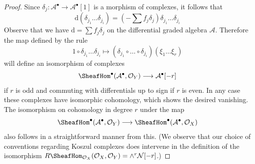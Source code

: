 \begin{proof}
Since $\delta_j : \mathcal{A}^\bullet \to \mathcal{A}^\bullet[1]$
is a morphism of complexes, it follows that
$$
\text{d}(\delta_{j_1} \ldots \delta_{j_i}) =
(- \sum f_j \delta_j )\delta_{j_1} \ldots \delta_{j_i}
$$
Observe that we have $\text{d} = \sum f_j \delta_j$ on the differential
graded algebra $\mathcal{A}$. Therefore the map defined by the rule
$$
1 \circ \delta_{j_1} \ldots \delta_{j_i} \longmapsto
(\delta_{j_1} \circ \ldots \circ \delta_{j_i})(\xi_1 \ldots \xi_r)
$$
will define an isomorphism of complexes
$$
\SheafHom^\bullet(\mathcal{A}^\bullet, \mathcal{O}_Y)
\longrightarrow \mathcal{A}^\bullet[-r]
$$
if $r$ is odd and commuting with differentials up to sign if $r$ is even.
In any case these complexes have isomorphic cohomology, which shows the
desired vanishing. The isomorphism on cohomology in degree $r$
under the map
$$
\SheafHom^\bullet(\mathcal{A}^\bullet, \mathcal{O}_Y)
\longrightarrow
\SheafHom^\bullet(\mathcal{A}^\bullet, \mathcal{O}_X)
$$
also follows in a straightforward manner from this.
(We observe that our choice of conventions regarding
Koszul complexes does intervene in the definition
of the isomorphism
$R\SheafHom_{\mathcal{O}_X}(\mathcal{O}_X, \mathcal{O}_Y) =
\wedge^r \mathcal{N}[-r]$.)
\end{proof}